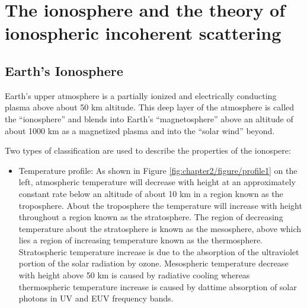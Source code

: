 \chapter{The ionosphere and the theory of ionospheric incoherent scattering}
\section{Earth's Ionosphere}
Earth's upper atmosphere is a partially ionized and electrically conducting plasma above about 50 km altitude. This deep layer of the atmosphere is called the ``ionosphere'' and blends into Earth's ``magnetosphere'' above an altitude of about 1000 km as a magnetized plasma and into the ``solar wind'' beyond.

Two types of classification are used to describe the properties of the ionospere:
\begin{itemize}
    \item Temperature profile: As shown in Figure \ref{fig:chapter2/figure/profile1} on the left, atmospheric temperature will decrease with height at an approximately constant rate below an altitude of about 10 km in a region known as the troposphere. About the troposphere the temperature will increase with height throughout a region known as the stratosphere. The region of decreasing temperature about the stratosphere is known as the mesosphere, above which lies a region of increasing temperature known as the thermosphere. Stratospheric temperature increase is due to the absorption of the ultraviolet portion of the solar radiation by ozone. Mesospheric temperature decrease with height above 50 km is caused by radiative cooling whereas thermospheric temperature increase is caused by dattime absorption of solar photons in UV and EUV frequency bands.

\end{itemize}
